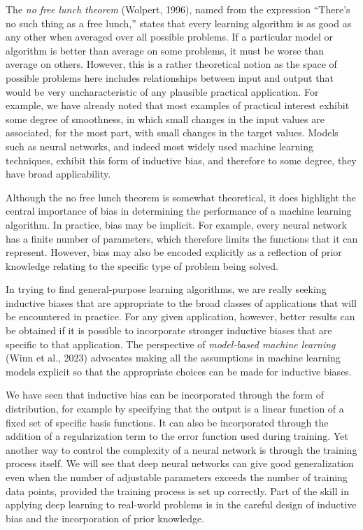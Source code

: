 \documentclass{article}
\begin{document}
The \emph{no free lunch theorem} (Wolpert, 1996), named from the expression ``There's no such thing as a free lunch,'' states that every learning algorithm is as good as any other when averaged over all possible problems. If a particular model or algorithm is better than average on some problems, it must be worse than average on others. However, this is a rather theoretical notion as the space of possible problems here includes relationships between input and output that would be very uncharacteristic of any plausible practical application. For example, we have already noted that most examples of practical interest exhibit some degree of smoothness, in which small changes in the input values are associated, for the most part, with small changes in the target values. Models such as neural networks, and indeed most widely used machine learning techniques, exhibit this form of inductive bias, and therefore to some degree, they have broad applicability.

Although the no free lunch theorem is somewhat theoretical, it does highlight the central importance of bias in determining the performance of a machine learning algorithm. In practice, bias may be implicit. For example, every neural network has a finite number of parameters, which therefore limits the functions that it can represent. However, bias may also be encoded explicitly as a reflection of prior knowledge relating to the specific type of problem being solved.

In trying to find general-purpose learning algorithms, we are really seeking inductive biases that are appropriate to the broad classes of applications that will be encountered in practice. For any given application, however, better results can be obtained if it is possible to incorporate stronger inductive biases that are specific to that application. The perspective of \emph{model-based machine learning} (Winn et al., 2023) advocates making all the assumptions in machine learning models explicit so that the appropriate choices can be made for inductive biases.

We have seen that inductive bias can be incorporated through the form of distribution, for example by specifying that the output is a linear function of a fixed set of specific basis functions. It can also be incorporated through the addition of a regularization term to the error function used during training. Yet another way to control the complexity of a neural network is through the training process itself. We will see that deep neural networks can give good generalization even when the number of adjustable parameters exceeds the number of training data points, provided the training process is set up correctly. Part of the skill in applying deep learning to real-world problems is in the careful design of inductive bias and the incorporation of prior knowledge.
\end{document}
